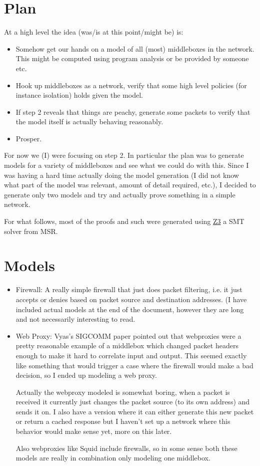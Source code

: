 \documentclass[11pt]{article}
\begin{document}
\section{Plan}
At a high level the idea (was/is at this point/might be) is:
\begin{itemize}
\item Somehow get our hands on a model of all (most) middleboxes in the
network. This might be computed using program analysis or be provided by
someone etc.
\item Hook up middleboxes as a network, verify that some high level policies (for instance isolation) holds given the model. 
\item If step 2 reveals that things are peachy, generate some packets to verify that the model itself is actually behaving reasonably.
\item Prosper.
\end{itemize}

For now we (I) were focusing on step 2. In particular the plan was to generate models for a variety of middleboxes and
see what we could do with this. Since I was having a hard time actually doing the model generation (I did not know what
part of the model was relevant, amount of detail required, etc.), I decided to generate only two models and try and
actually prove something in a simple network.

For what follows, most of the proofs and such were generated using \href{http://z3.codeplex.com/}{Z3} a SMT solver from
MSR.

\section{Models}
\begin{itemize}
\item Firewall: A really simple firewall that just does packet filtering, i.e. it just accepts or denies based on packet
source and destination addresses. (I have
included actual models at the end of the document, however they are long and not necessarily interesting to read. 

\item Web Proxy: Vyas's SIGCOMM paper pointed out that webproxies were a pretty reasonable example of a middlebox which
changed packet headers enough to make it hard to correlate input and output. This seemed exactly like something that
would trigger a case where the firewall would make a bad decision, so I ended up modeling a web proxy.

Actually the webproxy modeled is somewhat boring, when a packet is received it currently just changes the packet source
(to its own address) and sends it on. I also have a version where it can either generate this new packet or return a
cached response but I haven't set up a network where this behavior would make sense yet, more on this later.

Also webproxies like Squid include firewalls, so in some sense both these models are really in combination only
modeling one middlebox.
\end{itemize}
\end{document}

